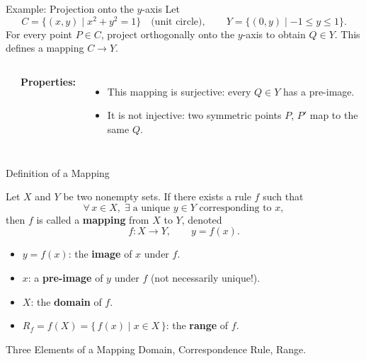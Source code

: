 \documentclass[aspectratio=169,10pt]{beamer}
\begin{document}
\begin{frame}{Example: Projection onto the $y$-axis}
  Let
  \[
    C = \{(x,y)\mid x^2+y^2=1\}\quad\text{(unit circle)},\qquad
    Y = \{(0,y)\mid -1\le y\le 1\}.
  \]
  \pause
  For every point $P\in C$, project orthogonally onto the $y$-axis
  to obtain $Q\in Y$. This defines a mapping $C\to Y$.
  \pause
  \begin{columns}
    \begin{center}
    \end{center}
    \small
    \textbf{Properties:}
    \begin{itemize}
      \item This mapping is \alert{surjective}: every $Q\in Y$ has a pre-image.
      \item It is \alert{not injective}: two symmetric points $P$, $P'$ map to the same $Q$.
    \end{itemize}
  \end{columns}
\end{frame}

\begin{frame}{Definition of a Mapping}
  \begin{definition}[Mapping]
    Let $X$ and $Y$ be two nonempty sets.
    If there exists a rule $f$ such that
    \[
      \forall\, x\in X,\;\exists\;\text{a unique } y\in Y \text{ corresponding to } x,
    \]
    then $f$ is called a \textbf{mapping} from $X$ to $Y$, denoted
    \[
      f\colon X \longrightarrow Y,\qquad y = f(x).
    \]
  \end{definition}
  \pause
  \begin{itemize}
    \item $y = f(x)$: the \textbf{image} of $x$ under $f$.
    \item $x$: a \textbf{pre-image} of $y$ under $f$ (not necessarily unique!).
    \item $X$: the \textbf{domain} of $f$.
    \item $R_f = f(X) = \{\,f(x)\mid x\in X\,\}$: the \textbf{range} of $f$.
  \end{itemize}
  \pause
  \begin{alertblock}{Three Elements of a Mapping}
    Domain, Correspondence Rule, Range.
  \end{alertblock}
\end{frame}
\end{document}
